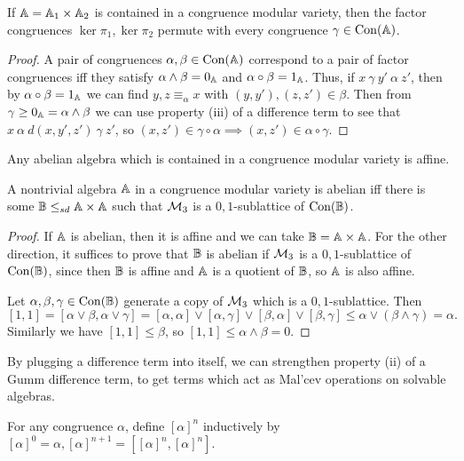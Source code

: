 \documentclass[letterpaper,11pt]{article}
\DeclareMathOperator{\Con}{Con}
\begin{document}
\begin{cor} If $\mathbb{A} = \mathbb{A}_1\times \mathbb{A}_2$ is contained in a congruence modular variety, then the factor congruences $\ker \pi_1,\ker \pi_2$ permute with every congruence $\gamma \in \Con(\bA)$.
\end{cor}
\begin{proof} A pair of congruences $\alpha,\beta \in \Con(\bA)$ correspond to a pair of factor congruences iff they satisfy $\alpha \wedge \beta = 0_{\mathbb{A}}$ and $\alpha \circ \beta = 1_{\mathbb{A}}$. Thus, if $x\ \gamma\ y'\ \alpha\ z'$, then by $\alpha \circ \beta = 1_{\mathbb{A}}$ we can find $y, z \equiv_\alpha x$ with $(y,y'), (z,z') \in \beta$. Then from $\gamma \ge 0_{\mathbb{A}} = \alpha \wedge \beta$ we can use property (iii) of a difference term to see that $x\ \alpha\ d(x,y',z')\ \gamma\ z'$, so $(x,z') \in \gamma \circ \alpha \implies (x,z') \in \alpha \circ \gamma$.
\end{proof}

\begin{cor} Any abelian algebra which is contained in a congruence modular variety is affine.
\end{cor}

\begin{cor} A nontrivial algebra $\mathbb{A}$ in a congruence modular variety is abelian iff there is some $\mathbb{B} \le_{sd} \mathbb{A}\times \mathbb{A}$ such that $\mathcal{M}_3$ is a $0,1$-sublattice of $\Con(\bB)$.
\end{cor}
\begin{proof} If $\mathbb{A}$ is abelian, then it is affine and we can take $\mathbb{B} = \mathbb{A}\times \mathbb{A}$. For the other direction, it suffices to prove that $\mathbb{B}$ is abelian if $\mathcal{M}_3$ is a $0,1$-sublattice of $\Con(\bB)$, since then $\mathbb{B}$ is affine and $\mathbb{A}$ is a quotient of $\mathbb{B}$, so $\mathbb{A}$ is also affine.

Let $\alpha, \beta, \gamma \in \Con(\bB)$ generate a copy of $\mathcal{M}_3$ which is a $0,1$-sublattice. Then
\[
[1,1] = [\alpha \vee \beta, \alpha \vee \gamma] = [\alpha,\alpha]\vee [\alpha,\gamma]\vee [\beta,\alpha]\vee [\beta,\gamma] \le \alpha \vee (\beta \wedge \gamma) = \alpha.
\]
Similarly we have $[1,1] \le \beta$, so $[1,1] \le \alpha \wedge \beta = 0$.
\end{proof}

By plugging a difference term into itself, we can strengthen property (ii) of a Gumm difference term, to get terms which act as Mal'cev operations on solvable algebras.

\begin{defn} For any congruence $\alpha$, define $[\alpha]^n$ inductively by $[\alpha]^0 = \alpha, [\alpha]^{n+1} = [[\alpha]^n,[\alpha]^n]$.
\end{defn}
\end{document}
